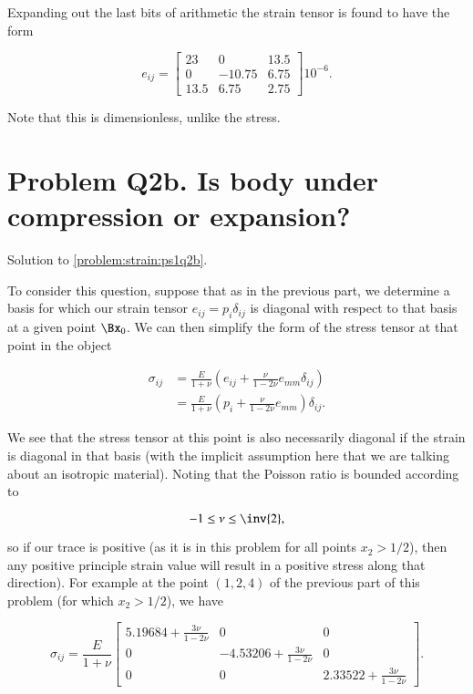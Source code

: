 Expanding out the last bits of arithmetic the strain tensor is found to have the form

\begin{equation}\label{eqn:continuumProblemSet1:230}
e_{ij}
=
\begin{bmatrix}
 23 & 0 & 13.5 \\
 0 & -10.75 & 6.75 \\
 13.5 & 6.75 & 2.75
\end{bmatrix}
 10^{-6}.
\end{equation}

Note that this is dimensionless, unlike the stress.

\label{solutions:ps1q2b}
\section{Problem Q2b. Is body under compression or expansion?}

Solution to \ref{problem:strain:ps1q2b}.

To consider this question, suppose that as in the previous part, we determine a basis for which our strain tensor $e_{ij} = p_i \delta_{ij}$ is diagonal with respect to that basis at a given point $\Bx_0$.  We can then simplify the form of the stress tensor at that point in the object

\begin{align*}
\sigma_{ij}
&=
\frac{E}{1 + \nu} \left(
e_{ij} + \frac{\nu}{1 - 2 \nu} e_{mm} \delta_{ij}
\right) \\
&=
\frac{E}{1 + \nu} \left(
p_i
 + \frac{\nu}{1 - 2 \nu} e_{mm}
\right)
\delta_{ij}.
\end{align*}

We see that the stress tensor at this point is also necessarily diagonal if the strain is diagonal in that basis (with the implicit assumption here that we are talking about an isotropic material).  Noting that the Poisson ratio is bounded according to

\begin{equation}\label{eqn:continuumProblemSet1:350}
-1 \le \nu \le \inv{2},
\end{equation}

so if our trace is positive (as it is in this problem for all points $x_2 > 1/2$), then any positive principle strain value will result in a positive stress along that direction).  For example at the point $(1,2,4)$ of the previous part of this problem (for which $x_2 > 1/2$), we have

\begin{equation}\label{eqn:continuumProblemSet1:370}
\sigma_{ij}
=
\frac{E}{1 + \nu}
\begin{bmatrix}
5.19684
+ \frac{3 \nu}{1 - 2 \nu}  & 0 & 0 \\
0 & -4.53206
+ \frac{3 \nu}{1 - 2 \nu}  & 0 \\
0 & 0 & 2.33522
+ \frac{3 \nu}{1 - 2 \nu}
\end{bmatrix}.
\end{equation}

